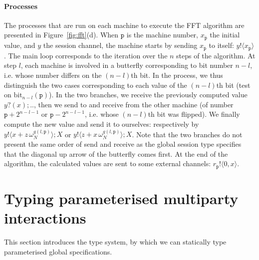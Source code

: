 \documentclass{LMCS}
\newcommand{\ptilde}[1]{{\ensuremath{#1}}}
\newcommand{\pp}{\ensuremath{\at{\p}}}
\newcommand{\x}{\ensuremath{x}}
\newcommand{\participant}[1]{\ensuremath{\mathtt{#1}}}
\newcommand{\p}{\ensuremath{\participant{p}}}
\newcommand{\z}{\ensuremath{z}}
\newcommand{\X}{\ensuremath{X}}
\newcommand{\at}[1]{\ensuremath{\ptilde{#1}}}
\newcommand{\outS}[3]{\ensuremath{#1!\langle #2\rangle;#3}}
\newcommand{\inpS}[3]{\ensuremath{#1?( #2);#3}}
\newcommand{\y}{\ensuremath{y}}
\newcommand{\bit}[1]{\ensuremath{\text{bit}_{#1}}}
\newcommand{\Poutend}[3]{\ensuremath{#1!\langle #2,#3\rangle}}
\begin{document}
\paragraph{\bf Processes}
The processes that are run on each machine to execute the FFT algorithm are
presented in Figure~\ref{fig:fft}(d). When $\pp$ is the machine number, $x_{\overline{\pp}}$ the initial value, and
$\y$ the session channel, the machine starts by sending $x_{\overline{\pp}}$ to
itself: $\y!\langle\x_{\overline{\pp}}\rangle$. The main loop corresponds to the
iteration over the $n$ steps of the algorithm. At step $l$, each machine is
involved in a butterfly corresponding to bit number $n-l$, i.e. whose number
differs on the $(n-l)$th bit. In the process, we thus distinguish the two cases
corresponding to each value of the $(n-l)$th bit (test on $\bit{n-l}(\pp)$). In
the two branches, we receive the previously computed value $\inpS{\y}\x{..}$,
then we send to and receive from the other machine (of number $\p+2^{n-l-1}$ or
$\p-2^{n-l-1}$, i.e. whose $(n-l)$th bit was flipped). We finally compute the
new value and send it to ourselves: respectively by
$\outS{\y}{\x+\z\,\omega_N^{g(l,\pp)}}{\X}$ or
$\outS{\y}{\z+\x\,\omega_N^{g(l,\pp)}}{\X}$. Note that the two branches do not
present the same order of send and receive as the global session type specifies
that the diagonal up arrow of the butterfly comes first. At the end of the
algorithm, the calculated values are sent to some external channels:
$\Poutend{r_\pp}{0}{\x}$.


\section{Typing parameterised multiparty interactions}
\label{sec:typing}
\noindent 
This section introduces the type system, by which we can statically type
parameterised global specifications.
\end{document}
